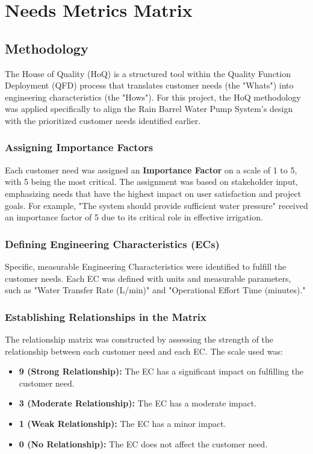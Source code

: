 \documentclass[12pt]{report}
\begin{document}
\section{Needs Metrics Matrix}

\subsection{Methodology}

The House of Quality (HoQ) is a structured tool within the Quality Function Deployment (QFD) process that translates customer needs (the "Whats") into engineering characteristics (the "Hows"). For this project, the HoQ methodology was applied specifically to align the Rain Barrel Water Pump System's design with the prioritized customer needs identified earlier.

\subsubsection{Assigning Importance Factors}

Each customer need was assigned an \textbf{Importance Factor} on a scale of 1 to 5, with 5 being the most critical. The assignment was based on stakeholder input, emphasizing needs that have the highest impact on user satisfaction and project goals. For example, "The system should provide sufficient water pressure" received an importance factor of 5 due to its critical role in effective irrigation.

\subsubsection{Defining Engineering Characteristics (ECs)}

Specific, measurable Engineering Characteristics were identified to fulfill the customer needs. Each EC was defined with units and measurable parameters, such as "Water Transfer Rate (L/min)" and "Operational Effort Time (minutes)."

\subsubsection{Establishing Relationships in the Matrix}

The relationship matrix was constructed by assessing the strength of the relationship between each customer need and each EC. The scale used was:

\begin{itemize}
    \item \textbf{9 (Strong Relationship):} The EC has a significant impact on fulfilling the customer need.
    \item \textbf{3 (Moderate Relationship):} The EC has a moderate impact.
    \item \textbf{1 (Weak Relationship):} The EC has a minor impact.
    \item \textbf{0 (No Relationship):} The EC does not affect the customer need.
\end{itemize}
\end{document}
